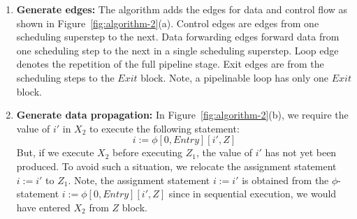 \begin{enumerate}
\item {\bf Generate edges:} The algorithm adds the edges for data and control flow as shown in Figure~\ref{fig:algorithm-2}(a). Control edges are edges from one scheduling superstep to the next. Data forwarding edges forward data from one scheduling step to the next in a single scheduling superstep. Loop edge denotes the repetition of the full pipeline stage. Exit edges are from the scheduling steps to the $Exit$ block. Note, a pipelinable loop has only one $Exit$ block.

\item {\bf Generate data propagation:} In Figure~\ref{fig:algorithm-2}(b), we require the value of $i'$ in $X_2$ to execute the following statement:
$$ i := \phi [0, Entry][i', Z]$$
But, if we execute $X_2$ before executing $Z_1$, the value of $i'$ has not yet been produced. To avoid such a situation, we relocate the assignment statement $i := i'$ to $Z_1$. Note, the assignment statement $i := i'$ is obtained from the $\phi$-statement $i := \phi [0, Entry][i', Z]$ since in sequential execution, we would have entered $X_2$ from $Z$ block.
\end{enumerate}
